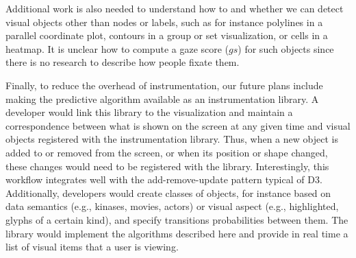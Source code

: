 Additional work is also needed to understand how to and whether we can detect visual objects other than nodes or labels, such as for instance polylines in a parallel coordinate plot, contours in a group or set visualization, or cells in a heatmap. It is unclear how to compute a gaze score ($gs$) for such objects since there is no research to describe how people fixate them. 

Finally, to reduce the overhead of instrumentation, our future plans include making the predictive algorithm available as an instrumentation library. A developer would link this library to the visualization and maintain a correspondence between what is shown on the screen at any given time and visual objects registered with the instrumentation library. Thus, when a new object is added to or removed from the screen, or when its position or shape changed, these changes would need to be registered with the library. Interestingly, this workflow integrates well with the add-remove-update pattern typical of D3. Additionally, developers would create classes of objects, for instance based on data semantics (e.g., kinases, movies, actors) or visual aspect (e.g., highlighted, glyphs of a certain kind), and specify transitions probabilities between them. The library would implement the algorithms described here and provide in real time a list of visual items that a user is viewing.
  